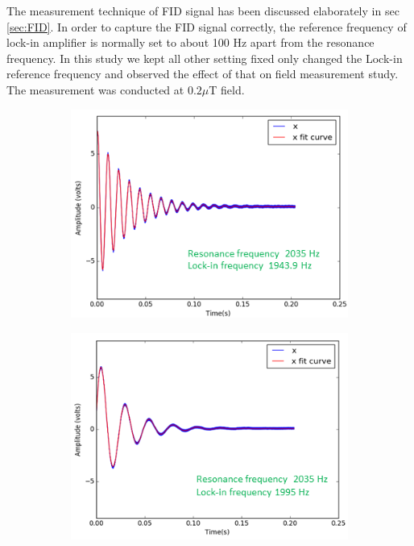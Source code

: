   The measurement technique of FID signal has been discussed elaborately in sec \ref{sec:FID}. In order to capture the FID signal correctly, the reference frequency of lock-in amplifier is normally set to about 100 Hz apart from the resonance frequency. In this study we kept all other setting fixed only changed the Lock-in reference frequency and observed the effect of that on field measurement study. The measurement was conducted at $0.2 \mu$T field. 
   \begin{figure}
    \centering
    \begin{subfigure}[b]{0.4\textwidth}
        \centering
        \includegraphics[width=\textwidth]{figures/reference_frequency1}
        \caption{}
        \label{fig:far from resonance}
    \end{subfigure}
    \hfill
    \begin{subfigure}[b]{0.4\textwidth}
        \centering
        \includegraphics[width=\textwidth]{figures/reference_frequency3}

\end{subfigure}
\end{figure}
